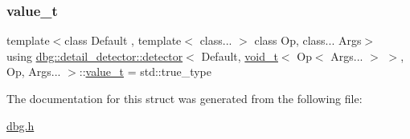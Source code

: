 \subsubsection{\texorpdfstring{value\+\_\+t}{value\_t}}
{\footnotesize\ttfamily template$<$class Default , template$<$ class... $>$ class Op, class... Args$>$ \\
using \hyperlink{structdbg_1_1detail__detector_1_1detector}{dbg\+::detail\+\_\+detector\+::detector}$<$ Default, \hyperlink{namespacedbg_1_1detail__detector_a1dbadccf461338e71c55ea392d4ed47c}{void\+\_\+t}$<$ Op$<$ Args... $>$ $>$, Op, Args... $>$\+::\hyperlink{structdbg_1_1detail__detector_1_1detector_3_01Default_00_01void__t_3_01Op_3_01Args_8_8_8_01_4_01_4_00_01Op_00_01Args_8_8_8_01_4_ab9dc20c0565be267d2d98b0e0f4a565b}{value\+\_\+t} =  std\+::true\+\_\+type}



The documentation for this struct was generated from the following file\+:\begin{DoxyCompactItemize}
\item 
\hyperlink{dbg_8h}{dbg.\+h}\end{DoxyCompactItemize}
